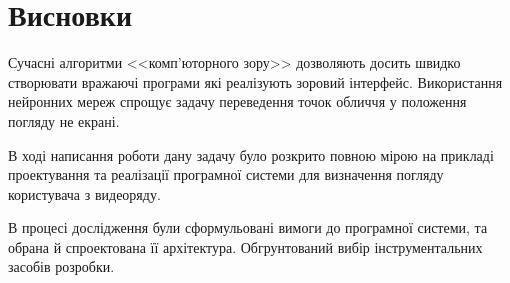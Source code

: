 \section*{Висновки}
Сучасні алгоритми <<комп'юторного зору>> дозволяють досить швидко створювати вражаючі програми які реалізують зоровий інтерфейс.
Використання нейронних мереж спрощує задачу переведення точок обличчя у положення погляду не екрані.

В ході написання роботи дану задачу було розкрито повною мірою на прикладі проектування та реалізації програмної системи для визначення погляду користувача з видеоряду.    

В процесі дослідження були сформульовані вимоги до програмної системи, та обрана й спроектована її архітектура.
Обгрунтований вибір інструментальних засобів розробки.

